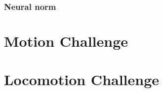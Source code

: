 \documentclass[conference]{IEEEtran}
\begin{document}

\subsubsection*{Neural norm}

\section{Motion Challenge}

\section{Locomotion Challenge}


%
%
\end{document}
